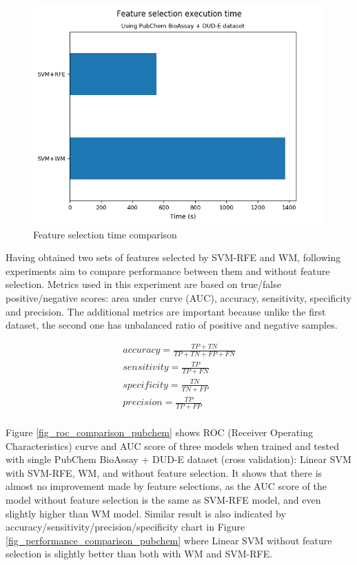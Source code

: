 \documentclass[conference,compsoc,12pt]{IEEEtran}
\begin{document}
	\begin{figure}
		\includegraphics[scale=0.5]{../images/feature_selection_time_comparison.png}
		\caption{Feature selection time comparison}
		\label{fig_feature_selection_time_comparison}
	\end{figure}
		
	Having obtained two sets of features selected by SVM-RFE and WM, following experiments aim to compare performance between them and without feature selection. Metrics used in this experiment are based on true/false positive/negative scores: area under curve (AUC), accuracy, sensitivity, specificity and precision. The additional metrics are important because unlike the first dataset, the second one has unbalanced ratio of positive and negative samples.

	\begin{align}
	accuracy = \frac{TP + TN}{TP + TN + FP + FN} \\
	sensitivity = \frac{TP}{TP + FN} \\	
	specificity = \frac{TN}{TN + FP} \\		
	precision = \frac{TP}{TP + FP} \\			
	\label{eq_performance_metrics}
	\end{align}

	Figure \ref{fig_roc_comparison_pubchem} shows ROC (Receiver Operating Characteristics) curve and AUC score of three models when trained and tested with single PubChem BioAssay + DUD-E dataset (cross validation): Linear SVM with SVM-RFE, WM, and without feature selection. It shows that there is almost no improvement made by feature selections, as the AUC score of the model without feature selection is the same as SVM-RFE model, and even slightly higher than WM model. Similar result is also indicated by accuracy/sensitivity/precision/specificity chart in Figure \ref{fig_performance_comparison_pubchem} where Linear SVM without feature selection is slightly better than both with WM and SVM-RFE.
		
\end{document}
